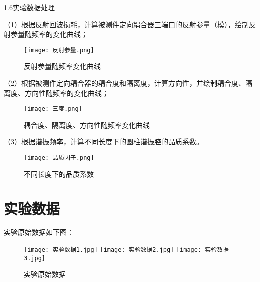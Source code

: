 \documentclass[UTF8]{ctexart}
\begin{document}
1.6实验数据处理

（1）根据反射回波损耗，计算被测件定向耦合器三端口的反射参量（模），绘制反射参量随频率的变化曲线；
\begin{figure}[!htp]
    \centering
    \texttt{[image: 反射参量.png]}
    \caption{反射参量随频率变化曲线}
\end{figure}

（2）根据被测件定向耦合器的耦合度和隔离度，计算方向性，并绘制耦合度、隔离度、方向性随频率的变化曲线；
\begin{figure}[!htp]
    \centering
    \texttt{[image: 三度.png]}
    \caption{耦合度、隔离度、方向性随频率变化曲线}
\end{figure}

（3）根据谐振频率，计算不同长度下的圆柱谐振腔的品质系数。
\begin{figure}[!htp]
    \centering
    \texttt{[image: 品质因子.png]}
    \caption{不同长度下的品质系数}
\end{figure}

\section{实验数据}
实验原始数据如下图：
\begin{figure}[!htp]
    \centering
    \texttt{[image: 实验数据1.jpg]}\qquad
    \texttt{[image: 实验数据2.jpg]}\qquad
    \texttt{[image: 实验数据3.jpg]}
    \caption{实验原始数据}
\end{figure}
\end{document}
